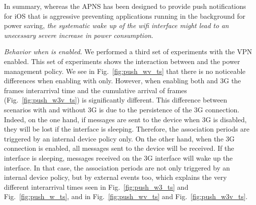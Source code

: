 In summary, whereas the APNS has been designed to provide push
notifications for iOS that is aggressive preventing applications
running in the background for power saving, \emph{the systematic wake up of
the wifi interface might lead to an unecessary severe increase in power
consumption}. 







\emph{Behavior when \meddle is enabled.} We performed a third set of experiments with the VPN enabled. This set
of experiments shows the interaction between \meddle 
and the power management policy. We see in
Fig.~\ref{fig:push_wv_ts} that
there is no noticeable differences when enabling \meddle with \wifi{} only. However,
when enabling both \wifi and 3G the frames interarrival time
and the cumulative arrival of frames (Fig.~\ref{fig:push_w3v_ts}) is
significantly different. This difference between scenarios with and
without 3G is due to the persistence of the 3G connection. Indeed, on
the one hand, if messages are sent to the device when 3G is disabled,
they will be lost if the \wifi interface is sleeping. Therefore, the
\wifi association periods are triggered by an internal device policy
only. On the other hand, when the 3G connection is enabled, all
messages sent to the device will be received. If the \wifi interface
is sleeping, messages received on the 3G interface will wake up the
\wifi interface. In that case, the \wifi association periods are not
only triggered by an internal device policy, but by external events
too, which explains the very different interarrival times seen in
Fig.~\ref{fig:push_w3_ts} and Fig.~\ref{fig:push_w_ts}, and in
Fig.~\ref{fig:push_wv_ts} and Fig.~\ref{fig:push_w3v_ts}.

